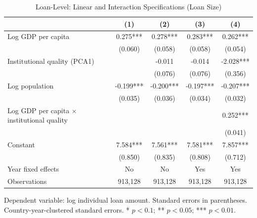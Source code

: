 \begin{table}[htbp]
\centering
\caption{Loan-Level: Linear and Interaction Specifications (Loan Size)}
\label{tab:table5}
\begin{tabular}{lcccc}
\toprule
 & (1) & (2) & (3) & (4) \\
\midrule
Log GDP per capita & 0.275*** & 0.278*** & 0.283*** & 0.262*** \\
 & (0.060) & (0.058) & (0.058) & (0.054) \\
Institutional quality (PCA1) &  & -0.011 & -0.014 & -2.028*** \\
 &  & (0.076) & (0.076) & (0.356) \\
Log population & -0.199*** & -0.200*** & -0.197*** & -0.207*** \\
 & (0.035) & (0.036) & (0.034) & (0.032) \\
Log GDP per capita $\times$ institutional quality &  &  &  & 0.252*** \\
 &  &  &  & (0.041) \\
Constant & 7.584*** & 7.561*** & 7.581*** & 7.857*** \\
 & (0.850) & (0.835) & (0.808) & (0.712) \\
\midrule
Year fixed effects & No & No & Yes & Yes \\
Observations & 913,128 & 913,128 & 913,128 & 913,128 \\
\bottomrule
\end{tabular}
\par\smallskip\footnotesize Dependent variable: log individual loan amount. Standard errors in parentheses. Country-year-clustered standard errors. * $p<0.1$; ** $p<0.05$; *** $p<0.01$.
\end{table}